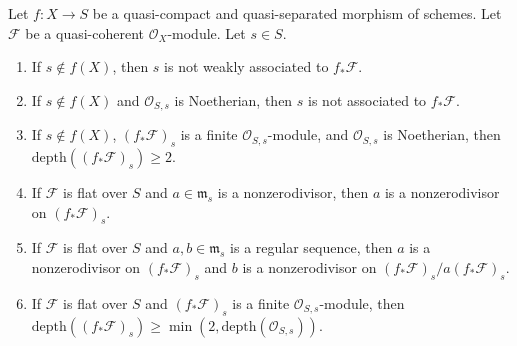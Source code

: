 \begin{lemma}
\label{lemma-depth-pushforward}
Let $f : X \to S$ be a quasi-compact and quasi-separated morphism of schemes.
Let $\mathcal{F}$ be a quasi-coherent $\mathcal{O}_X$-module.
Let $s \in S$.
\begin{enumerate}
\item If $s \not \in f(X)$, then $s$ is not weakly associated
to $f_*\mathcal{F}$.
\item If $s \not \in f(X)$ and $\mathcal{O}_{S, s}$ is Noetherian,
then $s$ is not associated to $f_*\mathcal{F}$.
\item If $s \not \in f(X)$, $(f_*\mathcal{F})_s$ is a finite
$\mathcal{O}_{S, s}$-module, and $\mathcal{O}_{S, s}$
is Noetherian, then $\text{depth}((f_*\mathcal{F})_s) \geq 2$.
\item If $\mathcal{F}$ is flat over $S$ and $a \in \mathfrak m_s$
is a nonzerodivisor, then $a$ is a nonzerodivisor on $(f_*\mathcal{F})_s$.
\item If $\mathcal{F}$ is flat over $S$ and $a, b \in \mathfrak m_s$
is a regular sequence, then $a$ is a nonzerodivisor on $(f_*\mathcal{F})_s$
and $b$ is a nonzerodivisor on $(f_*\mathcal{F})_s/a(f_*\mathcal{F})_s$.
\item If $\mathcal{F}$ is flat over $S$ and $(f_*\mathcal{F})_s$
is a finite $\mathcal{O}_{S, s}$-module, then
$\text{depth}((f_*\mathcal{F})_s) \geq
\min(2, \text{depth}(\mathcal{O}_{S, s}))$.
\end{enumerate}
\end{lemma}


